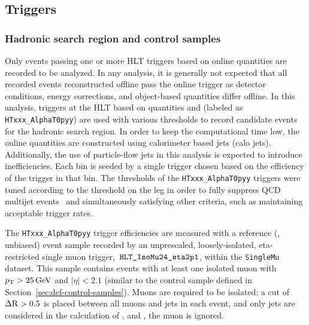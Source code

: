 \subsection{Triggers}

\subsubsection{Hadronic search region and control samples\label{sec:signal_triggers}} 

Only events passing one or more HLT triggers based on online quantities 
are recorded to be analyzed. In any analysis, it is generally not expected 
that all recorded events reconstructed offline pass the online 
trigger as detector conditions, energy corrections, and object-based quantities
differ offline. In this analysis, triggers at the HLT
based on quantities \scalht and \alphat (labeled as \verb!HTxxx_AlphaT0pyy!) 
are used with various thresholds to record candidate events for the hadronic search
region. In order to keep the computational time low, the online quantities
are constructed using calorimeter based jets (calo jets). Additionally, the use of
particle-flow jets in this analysis is expected to introduce inefficiencies.
Each \scalht bin is seeded by a single trigger chosen based on the
efficiency of the trigger in that \scalht bin. The \alphat thresholds of the
\verb!HTxxx_AlphaT0pyy! triggers were tuned according to the threshold
on the \scalht leg in order to fully suppress QCD multijet events~\cite{RA1Paper2012}
and simultaneously satisfying other criteria, such as maintaining
acceptable trigger rates.

The \verb!HTxxx_AlphaT0pyy! trigger efficiencies are measured with a
reference (\ie, unbiased) event sample recorded by an unprescaled,
loosely-isolated, eta-restricted single muon trigger,$\,$      $\verb!HLT_IsoMu24_eta2p1!$,
within the \verb!SingleMu! dataset. This sample contains events with  at 
least one isolated muon with $p_{\mathrm{T}} > 25\,\text{Ge\hspace{-.08em}V}$ and $|\eta| < 2.1$
(similar to the \mj control sample defined in 
Section~\ref{sec:def-control-samples}). Muons are required to be isolated: a cut of $\Delta
{\rm R} > 0.5$ is placed between all muons and jets in each event, and
only jets are considered in the calculation of \scalht, and
\alphat, \ie the muon is ignored.

